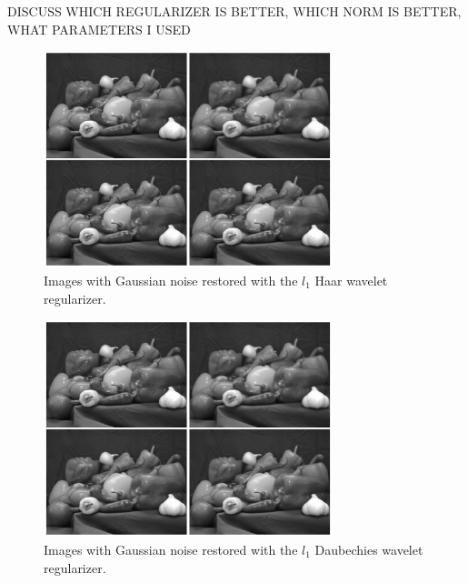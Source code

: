 \documentclass[10pt,a4paper]{article}
\begin{document}
	DISCUSS WHICH REGULARIZER IS BETTER, WHICH NORM IS BETTER, WHAT PARAMETERS I USED
	
	\begin{figure}[H]
		\begin{center}
			\includegraphics[width = 0.75\textwidth]{../figures/waveletGaussH.pdf} 
		\end{center}
		\caption{Images with Gaussian noise restored with the $l_1$ Haar wavelet regularizer.}
		\label{waveletH_gauss}
	\end{figure}
	
	\begin{figure}[H]
		\begin{center}
			\includegraphics[width = 0.75\textwidth]{../figures/waveletGaussD.pdf} 
		\end{center}
		\caption{Images with Gaussian noise restored with the $l_1$ Daubechies wavelet regularizer.}
		\label{waveletD_gauss}
	\end{figure}
	
\end{document}
